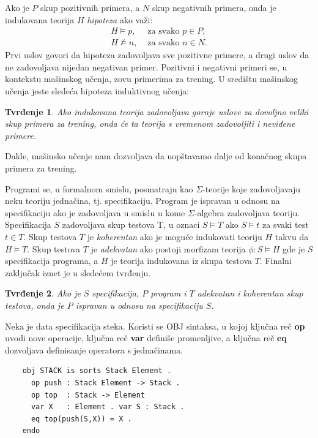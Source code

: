 \documentclass[a4paper]{article}
\newtheorem*{tvrdjenje}{Tvrđenje}
\theoremstyle{definition}
\begin{document}
{\par Ako je $P$ skup pozitivnih primera, a $N$ skup negativnih primera, onda je indukovana teorija $H$ \emph{hipoteza} ako važi:
\begin{eqnarray*}
H\models p, & \mbox{ za svako } p\in P,\\
H\not\models n, & \mbox{ za svako } n\in N.
\end{eqnarray*}
Prvi uslov govori da hipoteza zadovoljava sve pozitivne primere, a drugi uslov da ne zadovoljava nijedan negativan primer. Pozitivni i negativni primeri se, u kontekstu mašinskog učenja, zovu primerima za trening. U središtu mašinskog učenja jeste sledeća hipoteza induktivnog učenja:
\begin{tvrdjenje}
Ako indukovana teorija zadovoljava gornje uslove za dovoljno veliki skup primera za trening, onda će ta teorija s vremenom zadovoljiti i neviđene primere.
\end{tvrdjenje}
Dakle, mašinsko učenje nam dozvoljava da uopštavamo dalje od ko\-na\-čnog skupa primera za trening.

\par Programi se, u formalnom smislu, posmatraju kao $\Sigma$-teorije koje zadovoljavaju neku teoriju jednačina, tj. specifikaciju. Program je ispravan u odnosu na specifikaciju ako je zadovoljava u smislu u kome $\Sigma$-algebra zadovoljava teoriju. Specifikacija $S$ zadovoljava skup testova T, u oznaci $S\models T$ ako $S\models t$ za svaki test $t\in T$. Skup testova $T$ je \emph{koherentan} ako je moguće indukovati teoriju $H$ takvu da $H\models T$. Skup testova $T$ je \emph{adekvatan} ako postoji morfizam teorija $\phi:S\models H$ gde je $S$ specifikacija programa, a $H$ je teorija indukovana iz skupa testova $T$. Finalni zaključak iznet je u sledećem tvrđenju.

\begin{tvrdjenje}
Ako je $S$ specifikacija, $P$ program i $T$ adekvatan i koherentan skup testova, onda je $P$ ispravan u odnosu na specifikaciju $S$.
\end{tvrdjenje}

Neka je data specifikacija steka. Koristi se OBJ sintaksa, u kojoj ključna reč \textbf{op} uvodi nove operacije, ključna reč \textbf{var} definiše promenljive, a ključna reč \textbf{eq} dozvoljava definisanje operatora s jednačinama.

\begin{verbatim}
	obj STACK is sorts Stack Element .
	  op push : Stack Element -> Stack .
	  op top  : Stack -> Element
	  var X   : Element . var S : Stack .
	  eq top(push(S,X)) = X .
	endo
\end{verbatim}

}
\end{document}
